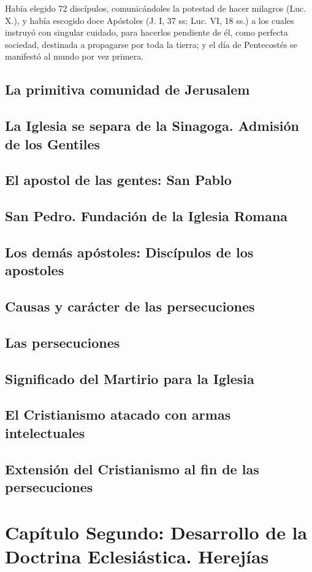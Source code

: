 \raggedbottom{} \documentclass[12pt, a4paper, openany]{book} %
\begin{document}
Había elegido 72 discípulos, comunicándoles la potestad de hacer milagros (Luc. X.), y había escogido doce Apóstoles (J. I, 37 ss; Luc. VI, 18 ss.) a los cuales instruyó con singular cuidado, para hacerlos pendiente de él, como perfecta sociedad, destinada a propagarse por toda la tierra; y el día de Pentecostés se manifestó al mundo por vez primera.

\section{La primitiva comunidad de Jerusalem}
\section{La Iglesia se separa de la Sinagoga. Admisión de los Gentiles}
\section{El apostol de las gentes: San Pablo}
\section{San Pedro. Fundación de la Iglesia Romana}
\section{Los demás apóstoles: Discípulos de los apostoles}
\section{Causas y carácter de las persecuciones}
\section{Las persecuciones}
\section{Significado del Martirio para la Iglesia}
\section{El Cristianismo atacado con armas intelectuales}
\section{Extensión del Cristianismo al fin de las persecuciones}
\chapter{Capítulo Segundo: Desarrollo de la Doctrina Eclesiástica. Herejías}
\end{document}
